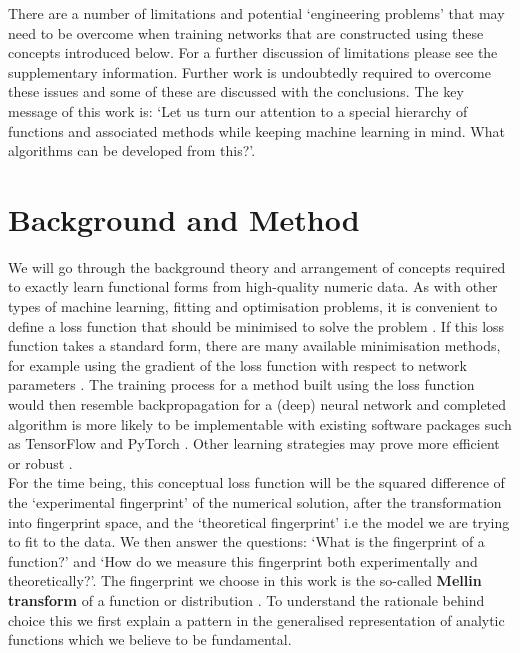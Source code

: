 \documentclass{article}
\begin{document}
There are a number of limitations and potential `engineering problems' that may need to be overcome when training networks that are constructed using these concepts introduced below. For a further discussion of limitations please see the supplementary information. Further work is undoubtedly required to overcome these issues and some of these are discussed with the conclusions. The key message of this work is: `Let us turn our attention to a special hierarchy of functions and associated methods while keeping machine learning in mind. What algorithms can be developed from this?'.


\section{Background and Method}
We will go through the background theory and arrangement of concepts required to exactly learn functional forms from high-quality numeric data. As with other types of machine learning, fitting and optimisation problems, it is convenient to define a loss function that should be minimised to solve the problem \cite{Rosasco2004}. If this loss function takes a standard form, there are many available minimisation methods, for example using the gradient of the loss function with respect to network parameters \cite{Ruder2016}. The training process for a method built using the loss function would then resemble backpropagation for a (deep) neural network \cite{Wang2017,Lecun2015} and completed algorithm is more likely to be implementable with existing software packages such as TensorFlow \cite{Abadi2016} and PyTorch \cite{Paszke2019}. Other learning strategies may prove more efficient or robust \cite{Greenfeld2019}.\\
 
For the time being, this conceptual loss function will be the squared difference of the `experimental fingerprint' of the numerical solution, after the transformation into fingerprint space, and the `theoretical fingerprint' i.e the model we are trying to fit to the data. We then answer the questions: `What is the fingerprint of a function?' and `How do we measure this fingerprint both experimentally and theoretically?'. The fingerprint we choose in this work is the so-called \textbf{Mellin transform} of a function or distribution \cite{Fikioris2006}. To understand the rationale behind choice this we first explain a pattern in the generalised representation of analytic functions which we believe to be fundamental.
\end{document}

